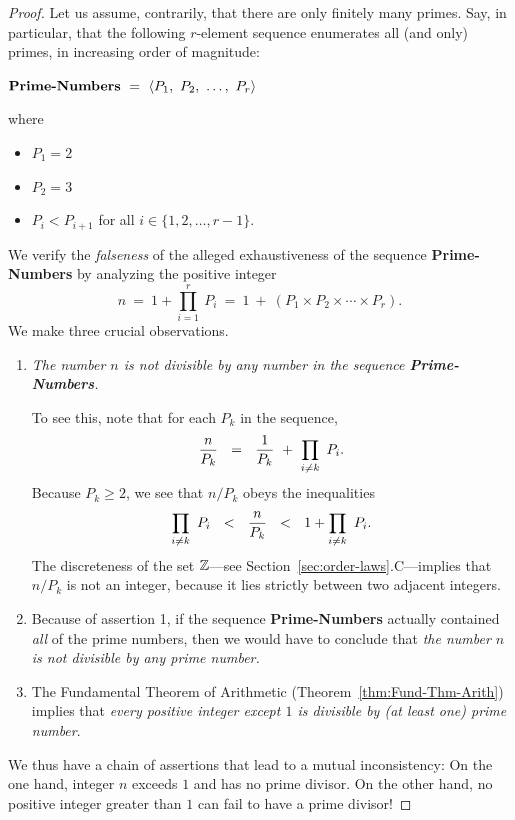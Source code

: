 \begin{proof}
Let us assume, contrarily, that there are only finitely many primes.  Say, in particular, that the following $r$-element sequence enumerates all (and only) primes, in increasing order of magnitude:

\medskip

$\mbox{\bf Prime-Numbers} \ = \ 
\langle P_1, \ P_2, \ \ldots, \ P_r \rangle$

\noindent where
\begin{itemize}
\item
$P_1 = 2$
\medskip\item
$P_2 = 3$
\medskip\item
$P_i < P_{i+1}$ for all $i \in \{1, 2, \ldots, r-1\}$.
\end{itemize}

\medskip

We verify the {\em falseness} of the alleged exhaustiveness of the sequence {\bf Prime-Numbers} by analyzing the positive integer
\[ n \ = \ 1 + \prod_{i=1}^r \ P_i \ = \ 1 \ + \ 
\left(P_1 \times P_2 \times \cdots \times P_r \right).
\]
We make three crucial observations.
\begin{enumerate}
\item
{\em The number $n$ is not divisible by any number in the sequence {\bf Prime-Numbers}.}

\smallskip

To see this, note that for each $P_k$ in the sequence,
\[
{n \over P_k} \ \ = \ \ \frac{1}{P_k} \ + \ \prod_{i \neq k} \ P_i .
\]
Because $P_k \geq 2$, we see that $n / P_k$ obeys the inequalities
\[
\prod_{i \neq k} \ P_i \ \ < \ \ {n \over P_k} \ \ < \ \ 1 + \prod_{i \neq k} \ P_i.
\] 
The discreteness of the set $\mathbb{Z}$---see Section~\ref{sec:order-laws}.C---implies that $n / P_k$ is not an integer, because it lies strictly between two adjacent integers.

\medskip\item
Because of assertion 1, if the sequence {\bf Prime-Numbers} actually contained {\em all} of the prime numbers, then we would have to conclude that {\em the number $n$ is not divisible by any prime number.}

\medskip\item
The Fundamental Theorem of Arithmetic (Theorem~\ref{thm:Fund-Thm-Arith}) implies that {\em every positive integer except $1$ is divisible by (at least one) prime number}.
\end{enumerate}

We thus have a chain of assertions that lead to a mutual inconsistency: On the one hand, integer $n$ exceeds $1$ and has no prime divisor.  On the other hand, no positive integer greater than $1$ can fail to have a prime divisor!


\end{proof}
